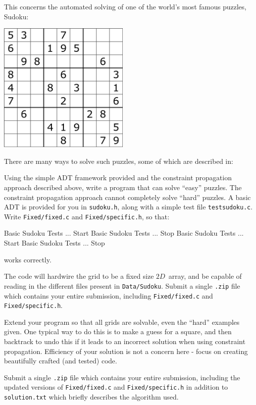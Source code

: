 
This concerns the automated solving of one of the world's most famous puzzles, Sudoku:
\begin{center}
\includegraphics[width=2.5in]{../Pictures/wiki_sudoku.png}
\end{center}

There are many ways to solve such puzzles, some of which are described in:


\begin{exercise}
\label{ex:sudoku1}

Using the simple ADT framework provided and the constraint propagation
approach described above, write a program that can solve ``easy'' puzzles.
The constraint propagation approach cannot completely solve ``hard''
puzzles.  A basic ADT is provided for you
in \verb^sudoku.h^, along with a simple test file
\verb^testsudoku.c^.
Write \verb^Fixed/fixed.c^
and \verb^Fixed/specific.h^, so that:

{\small
\begin{terminaloutput}
Basic Sudoku Tests ... Start
Basic Sudoku Tests ... Stop
Basic Sudoku Tests ... Start
Basic Sudoku Tests ... Stop
\end{terminaloutput}
}
\noindent works correctly. 

\noindent The code will hardwire the grid to be a fixed size $2D$~array,
and be capable of reading in the different files present in \verb^Data/Sudoku^.
Submit a single \verb^.zip^ file which contains your entire submission,
including \verb^Fixed/fixed.c^ and \verb^Fixed/specific.h^.
\end{exercise}

\begin{exercise}
\label{ex:sudoku2}

Extend your program so that all grids are solvable, even the ``hard''
examples given. One typical way to do this is to make a guess for a
square, and then backtrack to undo this if it leads to an incorrect
solution when using constraint propagation.
Efficiency of your solution is not a concern here - focus on creating
beautifully crafted (and tested) code.

\noindent Submit a single \verb^.zip^ file which contains your entire
submission, including the updated versions of \verb^Fixed/fixed.c^
and \verb^Fixed/specific.h^ in addition to \verb^solution.txt^ which
briefly describes the algorithm used.

\end{exercise}

